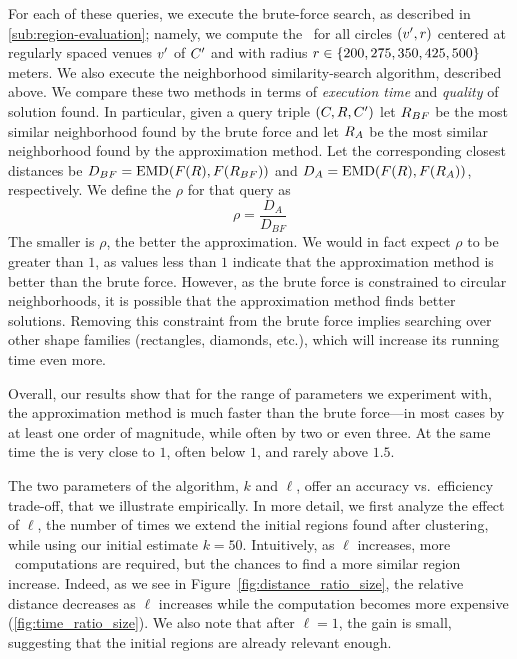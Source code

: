 For each of these queries, we execute the brute-force search, as
described in \autoref{sub:region-evaluation}; namely, 
we compute the \emd\ for all circles $({v}',{r})$ centered at
regularly spaced venues ${v}'$ of ${C}'$ and with radius ${r}\in\{200,
\allowbreak 275, \allowbreak 350, \allowbreak 425, \allowbreak 500\}$ meters.
We also execute the neighborhood similarity-search algorithm,
described above. 
We compare these two methods in terms of \emph{execution time} and
\emph{quality} of solution found. 
In particular, given a query  triple $({C}, {R}, {C}')$
let ${R}_{{BF}}$ be the most similar neighborhood found by
the brute force and 
let ${R}_{{A}}$ be the most similar neighborhood found by
the approximation method. 
Let the corresponding closest distances be
$D_{{BF}} = \mathrm{{EMD}}({F}({R}),{F}({R}_{{BF}}))$
and 
$D_{{A}} = \mathrm{{EMD}}({F}({R}),{F}({R}_{{A}}))$, 
respectively.
We  define the \emph{\Dratio{}} $\rho$ for that query
as  
\begin{equation*}
\rho = \frac{D_{{A}}}{ D_{{BF}} }
\end{equation*}
The smaller is $\rho$, the better the approximation.
We would in fact expect $\rho$ to be greater than $1$, as values less
than $1$ indicate that the approximation method is better than the brute
force.
However, as the brute force is constrained to circular neighborhoods,
it is possible that the approximation method finds better solutions.
Removing this constraint from the brute force implies searching
over other shape families (rectangles, diamonds, etc.), which will
increase its running time even more.

\medskip

Overall, our results show that for the range of parameters we
experiment with, the approximation method is much faster than the brute
force---in most cases by at least one order of magnitude, while
often by two or even three.
At the same time the \Dratio{} is very close to $1$, often below $1$,
and rarely above $1.5$.

The two parameters of the algorithm, $k$ and $\ell$, offer an accuracy vs.\
efficiency trade-off, that we illustrate empirically.
In more detail, we first analyze the effect of $\ell$, the number of times we
extend the initial regions found after clustering, while using our initial
estimate $k=50$. 
Intuitively, as $\ell$ increases, more \emd\ computations are required, but the
chances to find a more similar region increase. Indeed, as we see in
Figure~\ref{fig:distance_ratio_size}, 
the relative distance decreases as $\ell$ increases while the
computation becomes more expensive (\autoref{fig:time_ratio_size}). 
We also note that after $\ell=1$, the gain is small, suggesting that
the initial regions are already relevant enough.

